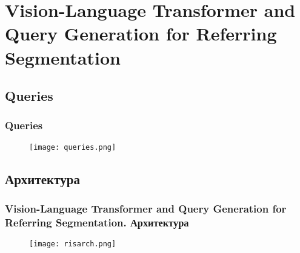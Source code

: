 
\section{Vision-Language Transformer and Query Generation for Referring
Segmentation}
\subsection{Queries}
\begin{frame}
    \frametitle{Queries}
    \begin{figure}
        \texttt{[image: queries.png]}
    \end{figure}
\end{frame}
\subsection{Архитектура}
\begin{frame}
    \frametitle{Vision-Language Transformer and Query Generation for Referring
    Segmentation. Архитектура}
    \begin{figure}
        \texttt{[image: risarch.png]}
    \end{figure}
\end{frame}